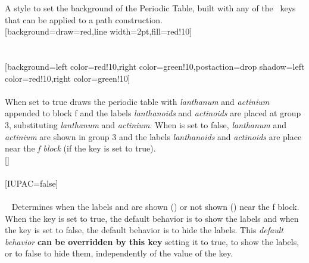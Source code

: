 \label{style_paper}%
%
{A style to set the background of the Periodic Table, built with any of the \txttikz\ keys that can be applied to a path construction.}%
\\ [5pt][background={draw=red,line width=2pt,fill=red!10}]%
\\ [10pt]\makebox[\linewidth][c]{\scalebox{.6}{\pgfPT[background={draw=red,line width=2pt,fill=red!10}]}}%
\\ [10pt]
\\ [-4pt][background={left color=red!10,right color=green!10,postaction={drop shadow={left color=red!10,right color=green!10}}}]%
\\ [10pt]\makebox[\linewidth][c]{\scalebox{.6}{\pgfPT[background={left color=red!10,right color=green!10,postaction={drop shadow={left color=red!10,right color=green!10}}}]}}%
\\ [5pt]\pgfPTendstyle%
\label{option_IUPAC}%
%
{When set to true draws the periodic table with \textit{lanthanum} and \textit{actinium} appended to block f and the labels \textit{lanthanoids} and \textit{actinoids} are placed at group 3, substituting \textit{lanthanum} and \textit{actinium}. When  is set to false, \textit{lanthanum} and \textit{actinium} are shown in group 3 and the labels \textit{lanthanoids} and \textit{actinoids} are place near the \textit{f block} (if the key  is set to true).
}%
\\ [5pt][]%
\\ [10pt]\makebox[\linewidth][c]{\scalebox{.6}{\pgfPT}}%
\\ [10pt][IUPAC=false]%
\\ [10pt]\makebox[\linewidth][c]{\scalebox{.6}{\pgfPT[IUPAC=false]}}%
\\ [5pt]\pgfPTendoption%
\newpage\vspace{-34pt}\ %
\label{option_show label LaAc}%
%
{Determines when the labels  and  are shown () or not shown () near the f block. When the  key is set to true, the default behavior is to show the labels and when the  key is set to false, the default behavior is to hide the labels. This \textit{default behavior} \textbf{can be overridden by this key} setting it to true, to show the labels, or to false to hide them, independently of the value of the  key.
}%
